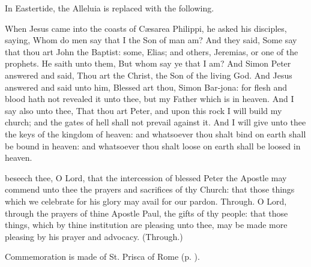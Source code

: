 
\begin{rubric}
	In Eastertide, the Alleluia is replaced with the following.
\end{rubric}


 When Jesus came into the coasts of C{\ae}sarea Philippi, he asked his disciples, saying, Whom do men say that I the Son of man am? And they said, Some say that thou art John the Baptist: some, Elias; and others, Jeremias, or one of the prophets. He saith unto them, But whom say ye that I am? And Simon Peter answered and said, Thou art the Christ, the Son of the living God. And Jesus answered and said unto him, Blessed art thou, Simon Bar-jona: for flesh and blood hath not revealed it unto thee, but my Father which is in heaven. And I say also unto thee, That thou art Peter, and upon this rock I will build my church; and the gates of hell shall not prevail against it. And I will give unto thee the keys of the kingdom of heaven: and whatsoever thou shalt bind on earth shall be bound in heaven: and whatsoever thou shalt loose on earth shall be loosed in heaven.


\secret
{} beseech thee, O Lord, that the intercession of blessed Peter the Apostle may commend unto thee the prayers and sacrifices of thy Church: that those things which we celebrate for his glory may avail for our pardon. Through.
 O Lord, through the prayers of thine Apostle Paul, the gifts of thy people: that those things, which by thine institution are pleasing unto thee, may be made more pleasing by his prayer and advocacy. (Through.)

\begin{rubric}
    Commemoration is made of St. Prisca of Rome (p. \pageref{PriscaSecret}).
\end{rubric}

